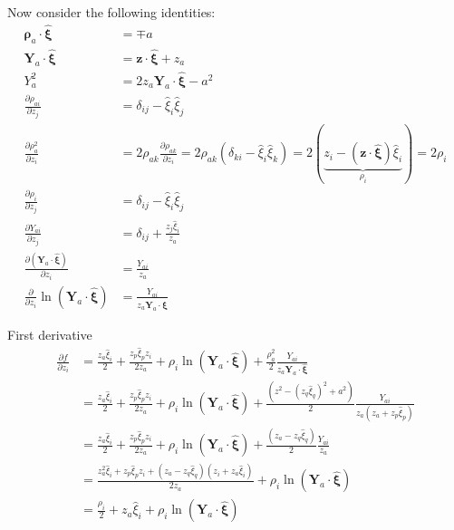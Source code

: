Now consider the following identities:
\begin{align}
\bm\rho_a\cdot\hat{\bm\xi}&=\mp a\\
\bm Y_a\cdot\hat{\bm \xi}&=\bm z\cdot\hat{\bm\xi}+z_a\\
Y^2_a&=2z_a\bm Y_a\cdot\hat{\bm \xi}-a^2\\
\frac{\partial \rho_{ai}}{\partial z_j}&=\delta_{ij}-\hat{\xi}_i\hat{\xi}_j\\
\frac{\partial \rho^2_a}{\partial z_i}&=2\rho_{ak} \frac{\partial  \rho_{ak}}{\partial z_i}=2\rho_{ak}\left(\delta_{ki}-\hat{\xi}_i\hat{\xi}_k\right)
=2(\underbrace{z_i-(\bm z\cdot\hat{\bm \xi})\hat{ \xi}_i}_{\rho_i})=2\rho_{i}\\
\frac{\partial \rho_{i}}{\partial z_j}&=\delta_{ij}-\hat{\xi}_i\hat{\xi}_j\\
\frac{\partial Y_{ai}}{\partial z_j}&=\delta_{ij}+\frac{z_j\hat{\xi}_i}{z_a}\\
\frac{\partial (\bm Y_a \cdot \hat{\bm \xi})}{\partial z_i}&=\frac{ Y_{ai}}{z_a}\\
\frac{\partial }{\partial z_i}\ln (\bm Y_a \cdot \hat{\bm \xi})&=\frac{ Y_{ai}}{z_a \bm Y_a \cdot \hat{\bm \xi}}
\end{align}

First derivative
\begin{align}
\frac{\partial f}{\partial  z_i}
&=\frac{z_a\hat{\xi}_i}{2}+\frac{z_p\hat{\xi}_p z_i}{2z_a}+\rho_i\ln(\bm Y_a \cdot \hat{\bm \xi})+\frac{\rho^2_a}{2}\frac{ Y_{ai}}{z_a \bm Y_a \cdot \hat{\bm \xi}}\nonumber\\
&=\frac{z_a\hat{\xi}_i}{2}+\frac{z_p\hat{\xi}_p z_i}{2z_a}+\rho_i\ln(\bm Y_a \cdot \hat{\bm \xi})+\frac{(z^2-(z_q\hat{\xi}_q)^2+a^2)}{2}\frac{ Y_{ai}}{z_a (z_a+z_p\hat{\xi}_p)}\nonumber\\
&=\frac{z_a\hat{\xi}_i}{2}+\frac{z_p\hat{\xi}_p z_i}{2z_a}+\rho_i\ln(\bm Y_a \cdot \hat{\bm \xi})+\frac{(z_a-z_q\hat{\xi}_q)}{2}\frac{ Y_{ai}}{z_a }\nonumber\\
&=\frac{z_a^2\hat{\xi}_i+z_p\hat{\xi}_p z_i+(z_a-z_q\hat{\xi}_q)(z_i+z_a\hat{\xi}_i)}{2z_a}+\rho_i\ln(\bm Y_a \cdot \hat{\bm \xi})\nonumber\\
&=\frac{\rho_i}{2}+z_a\hat{\xi}_i+\rho_i\ln(\bm Y_a \cdot \hat{\bm \xi})
\end{align}


